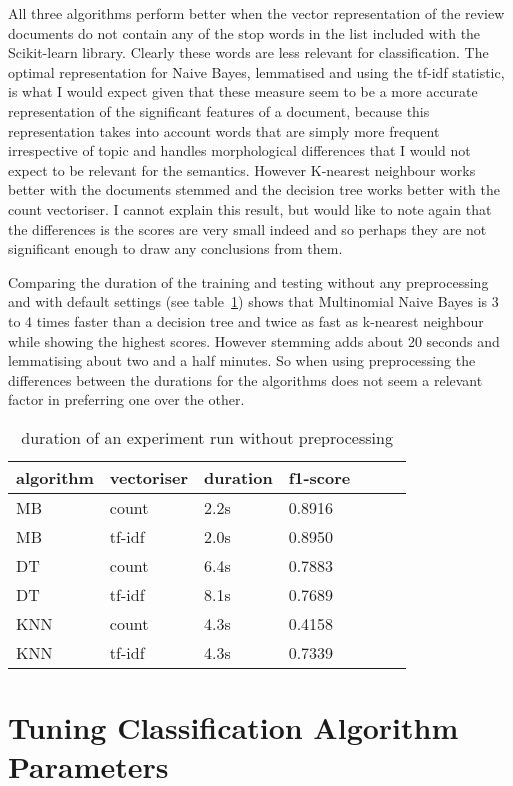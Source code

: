 \documentclass[11pt]{article}
\begin{document}
All three algorithms perform better when the vector representation of the review documents do not contain any of the stop words in the list included with the Scikit-learn library. Clearly these words are less relevant for classification. The optimal representation for Naive Bayes, lemmatised and using the tf-idf statistic, is what I would expect given that these measure seem to be a more accurate representation of the significant features of a document, because this representation takes into account words that are simply more frequent irrespective of topic and handles morphological differences that I would not expect to be relevant for the semantics. However K-nearest neighbour works better with the documents stemmed and the decision tree works better with the count vectoriser. I cannot explain this result, but would like to note again that the differences is the scores are very small indeed and so perhaps they are not significant enough to draw any conclusions from them.

Comparing the duration of the training and testing without any preprocessing and with default settings (see table~\ref{tab:repres-duration}) shows that Multinomial Naive Bayes is 3 to 4 times faster than a decision tree and twice as fast as k-nearest neighbour while showing the highest scores. However stemming adds about 20 seconds and lemmatising about two and a half minutes. So when using preprocessing the differences between the durations for the algorithms does not seem a relevant factor in preferring one over the other.

\begin{table}[ht]\footnotesize
\centering
\begin{tabular}{ l l l l l l l }
algorithm & vectoriser & duration & f1-score \\
\hline
MB & count &  2.2s & 0.8916 \\
MB & tf-idf & 2.0s & 0.8950 \\
DT & count &  6.4s & 0.7883 \\
DT & tf-idf & 8.1s & 0.7689 \\
KNN & count & 4.3s & 0.4158 \\
KNN & tf-idf & 4.3s & 0.7339 \\
\end{tabular}
\caption{duration of an experiment run without preprocessing}
\label{tab:repres-duration}
\end{table}

\section{Tuning Classification Algorithm Parameters}
\end{document}
